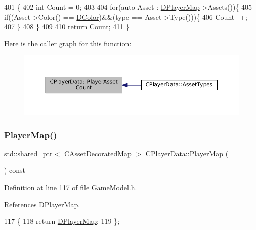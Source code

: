\begin{DoxyCode}
401                                                 \{
402     \textcolor{keywordtype}{int} Count = 0;
403     
404     \textcolor{keywordflow}{for}(\textcolor{keyword}{auto} Asset : \hyperlink{classCPlayerData_a452163191cd4603e1e38dd8d4bb9691c}{DPlayerMap}->Assets())\{
405         \textcolor{keywordflow}{if}((Asset->Color() == \hyperlink{classCPlayerData_a65d69aaa09c8fc0f7ddfa5e858313085}{DColor})&&(type == Asset->Type()))\{
406             Count++;
407         \}
408     \}
409     
410     \textcolor{keywordflow}{return} Count;
411 \}
\end{DoxyCode}
Here is the caller graph for this function\+:\nopagebreak
\begin{figure}[H]
\begin{center}
\leavevmode
\includegraphics[width=350pt]{classCPlayerData_a3fe55bd902f7a819c0689825d8ad3e4c_icgraph}
\end{center}
\end{figure}
\hypertarget{classCPlayerData_a9a54d695ff57c633dfb3a18c98408c54}{}\label{classCPlayerData_a9a54d695ff57c633dfb3a18c98408c54} 
\subsubsection{\texorpdfstring{Player\+Map()}{PlayerMap()}}
{\footnotesize\ttfamily std\+::shared\+\_\+ptr$<$ \hyperlink{classCAssetDecoratedMap}{C\+Asset\+Decorated\+Map} $>$ C\+Player\+Data\+::\+Player\+Map (\begin{DoxyParamCaption}{ }\end{DoxyParamCaption}) const\hspace{0.3cm}{\ttfamily [inline]}}



Definition at line 117 of file Game\+Model.\+h.



References D\+Player\+Map.


\begin{DoxyCode}
117                                                              \{
118             \textcolor{keywordflow}{return} \hyperlink{classCPlayerData_a452163191cd4603e1e38dd8d4bb9691c}{DPlayerMap};   
119         \};
\end{DoxyCode}
\hypertarget{classCPlayerData_a1c926b101513f871ec85e34ac3c83ec4}{}\label{classCPlayerData_a1c926b101513f871ec85e34ac3c83ec4} 
